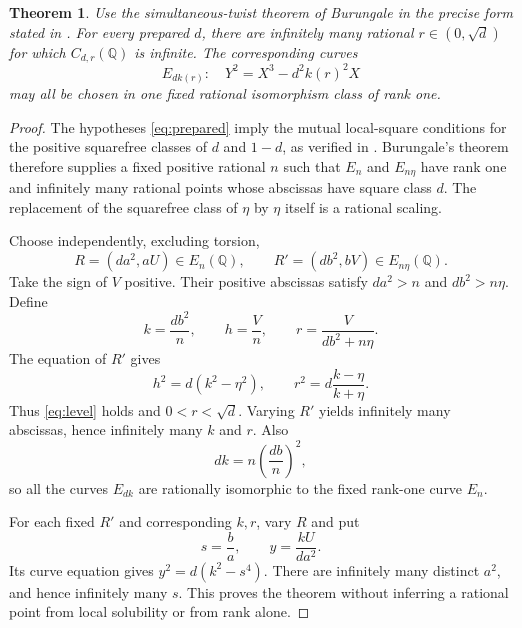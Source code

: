 \documentclass[11pt,a4paper]{article}
\newtheorem{theorem}{Theorem}
\newcommand{\Q}{\mathbb Q}
\begin{document}
\begin{theorem}\label{thm:global}
Use the simultaneous-twist theorem of Burungale in the precise form
stated in \cite[Section 2]{Intrinsic}. For every prepared $d$, there
are infinitely many rational $r\in(0,\sqrt d)$ for which
$C_{d,r}(\Q)$ is infinite. The corresponding curves
\[
E_{dk(r)}:\quad Y^2=X^3-d^2k(r)^2X
\]
may all be chosen in one fixed rational isomorphism class of
rank one.
\end{theorem}
\begin{proof}
The hypotheses \eqref{eq:prepared} imply the mutual local-square
conditions for the positive squarefree classes of $d$ and $1-d$,
as verified in \cite{Intrinsic}. Burungale's theorem therefore
supplies a fixed positive rational $n$ such that $E_n$ and
$E_{n\eta}$ have rank one and infinitely many rational points
whose abscissas have square class $d$. The replacement of the
squarefree class of $\eta$ by $\eta$ itself is a rational scaling.

Choose independently, excluding torsion,
\[
R=(da^2,aU)\in E_n(\Q),\qquad
R'=(db^2,bV)\in E_{n\eta}(\Q).
\]
Take the sign of $V$ positive. Their positive abscissas satisfy
$da^2>n$ and $db^2>n\eta$. Define
\begin{equation}\label{eq:globalconstruction}
k=\frac{db^2}{n},\qquad h=\frac Vn,\qquad
r=\frac{V}{db^2+n\eta}.
\end{equation}
The equation of $R'$ gives
\[
h^2=d(k^2-\eta^2),\qquad
r^2=d\frac{k-\eta}{k+\eta}.
\]
Thus \eqref{eq:level} holds and $0<r<\sqrt d$.
Varying $R'$ yields infinitely many abscissas, hence infinitely
many $k$ and $r$. Also
\[
dk=n\left(\frac{db}{n}\right)^2,
\]
so all the curves $E_{dk}$ are rationally isomorphic to the fixed
rank-one curve $E_n$.

For each fixed $R'$ and corresponding $k,r$, vary $R$ and put
\[
s=\frac ba,\qquad y=\frac{kU}{da^2}.
\]
Its curve equation gives $y^2=d(k^2-s^4)$. There are infinitely
many distinct $a^2$, and hence infinitely many $s$. This proves
the theorem without inferring a rational point from local
solubility or from rank alone.
\end{proof}
\end{document}
